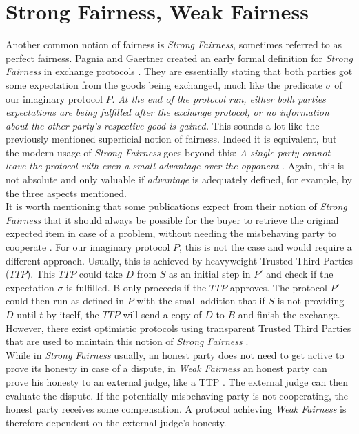 \documentclass{cacthesis}
\newcounter{protocol}
\begin{document}
        \section{Strong Fairness, Weak Fairness}
        Another common notion of fairness is \textit{Strong Fairness}, sometimes referred to as perfect fairness. Pagnia and Gaertner created an early formal definition for \textit{Strong Fairness} in exchange protocols \cite{Pagnia99onthe}. They are essentially stating that both parties got some expectation from the goods being exchanged, much like the predicate $\sigma$ of our imaginary protocol $P$. \textit{At the end of the protocol run, either both parties expectations are being fulfilled after the exchange protocol, or no information about the other party's respective good is gained.} This sounds a lot like the previously mentioned superficial notion of fairness. Indeed it is equivalent, but the modern usage of \textit{Strong Fairness} goes beyond this: \textit{A single party cannot leave the protocol with even a small advantage over the opponent} \cite{DELGADOSEGURA2020832}. Again, this is not absolute and only valuable if \textit{advantage} is adequately defined, for example, by the three aspects mentioned. \\
        It is worth mentioning that some publications expect from their notion of \textit{Strong Fairness} that it should always be possible for the buyer to retrieve the original expected item in case of a problem, without needing the misbehaving party to cooperate \cite{DELGADOSEGURA2020832}. For our imaginary protocol $P$, this is not the case and would require a different approach. Usually, this is achieved by heavyweight Trusted Third Parties ($TTP$). This $TTP$ could take $D$ from $S$ as an initial step in $P'$ and check if the expectation $\sigma$ is fulfilled. B only proceeds if the $TTP$ approves. The protocol $P'$ could then run as defined in $P$ with the small addition that if $S$ is not providing $D$ until $t$ by itself, the $TTP$ will send a copy of $D$ to $B$ and finish the exchange. However, there exist optimistic protocols using transparent Trusted Third Parties that are used to maintain this notion of \textit{Strong Fairness} \cite{6982058} \cite{10.1007/3-540-36552-4_31}. \\
        While in \textit{Strong Fairness} usually, an honest party does not need to get active to prove its honesty in case of a dispute, in \textit{Weak Fairness} an honest party can prove his honesty to an external judge, like a TTP \cite{10.1007/3-540-36552-4_31}. The external judge can then evaluate the dispute. If the potentially misbehaving party is not cooperating, the honest party receives some compensation. A protocol achieving \textit{Weak Fairness} is therefore dependent on the external judge's honesty.
        
\end{document}
